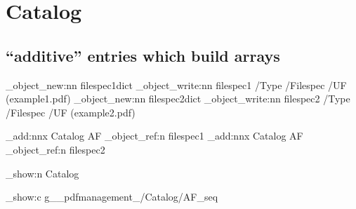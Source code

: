 \documentclass{article}
\begin{document}
\Form {}
\section{Catalog}
\subsection{\enquote{additive} entries which build arrays}
\ExplSyntaxOn
\pdf_object_new:nn   {filespec1}{dict}
\pdf_object_write:nn {filespec1} {/Type /Filespec /UF (example1.pdf)}
\pdf_object_new:nn   {filespec2}{dict}
\pdf_object_write:nn {filespec2} {/Type /Filespec /UF (example2.pdf)}

\pdfmanagement_add:nnx { Catalog } {AF} {\pdf_object_ref:n {filespec1}}
\pdfmanagement_add:nnx { Catalog } {AF} {\pdf_object_ref:n {filespec2}}

\pdfmanagement_show:n {Catalog} %

\seq_show:c { g__pdfmanagement_/Catalog/AF_seq }
\ExplSyntaxOff
\end{document}
